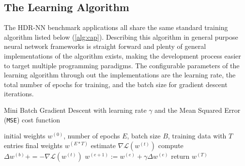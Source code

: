 \subsection[HDR-NN Training]{The Learning Algorithm}

The HDR-NN benchmark applications all share the same standard training algorithm listed below (\ref{alg:cap}). Describing this algorithm in general purpose neural network frameworks is straight forward and plenty of general implementations of the algorithm exists, making the development process easier to target multiple programming paradigms. The configurable parameters of the learning algorithm through out the implementations are the learning rate, the total number of epochs for training, and the batch size for gradient descent iterations.

\begin{algorithm}[h]
	\caption{Mini Batch Gradient Descent with learning rate $\gamma$ and the Mean Squared Error (\texttt{MSE}) cost function}
	\label{alg:cap}
	\begin{algorithmic}
	\Require initial weights $w^{(0)}$, number of epochs $E$, batch size $B$, training data with $T$ entries
	\Ensure final weights $w^{(E*T)}$
			\State estimate $\nabla \mathcal{L}(w^{(t)})$ 
			\State compute $\Delta w^{(b)} += - \nabla \mathcal{L}(w^{(t)})$\label{lin:deep-learning-delta-w}
			\EndFor
			\State $w^{(e + 1)} := w^{(e)} + \gamma \Delta w^{(e)}$
		\EndFor
	\EndFor
	\State return $w^{(T)}$
	\end{algorithmic}
\end{algorithm}



